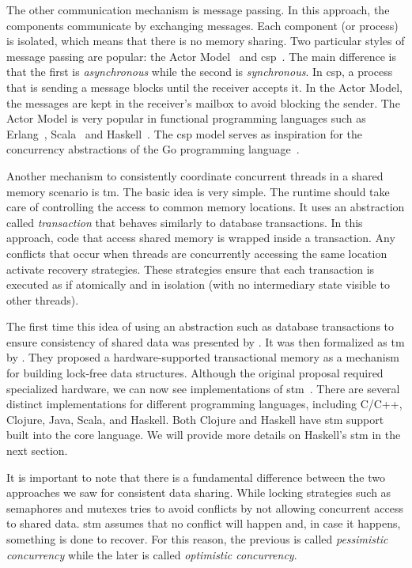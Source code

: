 The other communication mechanism is message passing. In this approach, the components communicate by exchanging messages. Each component (or process) is isolated, which means that there is no memory sharing. Two particular styles of message passing are popular: the Actor Model~\cite{agha:1986} and \ac{csp}~\cite{hoare:1978}. The main difference is that the first is \emph{asynchronous} while the second is \emph{synchronous}. In \acs{csp}, a process that is sending a message blocks until the receiver accepts it. In the Actor Model, the messages are kept in the receiver's mailbox to avoid blocking the sender. The Actor Model is very popular in functional programming languages such as Erlang~\cite{armstrong:2007}, Scala~\cite{haller:2009} and Haskell~\cite{epstein:2011}. The \acs{csp} model serves as inspiration for the concurrency abstractions of the Go programming language~\cite{pike:2012}.

Another mechanism to consistently coordinate concurrent threads in a shared memory scenario is \ac{tm}. The basic idea is very simple. The runtime should take care of controlling the access to common memory locations. It uses an abstraction called \emph{transaction} that behaves similarly to database transactions. In this approach, code that access shared memory is wrapped inside a transaction. Any conflicts that occur when threads are concurrently accessing the same location activate recovery strategies. These strategies ensure that each transaction is executed as if atomically and in isolation (with no intermediary state visible to other threads).

The first time this idea of using an abstraction such as database transactions to ensure consistency of shared data was presented by . It was then formalized as \acl{tm} by . They proposed a hardware-supported transactional memory as a mechanism for building lock-free data structures. Although the original proposal required specialized hardware, we can now see implementations of \ac{stm}~\cite{shavit:1995}. There are several distinct implementations for different programming languages, including C/C++, Clojure, Java, Scala, and Haskell. Both Clojure and Haskell have  \acs{stm} support built into the core language. We will provide more details on Haskell's \acs{stm} in the next section.

It is important to note that there is a fundamental difference between the two approaches we saw for consistent data sharing. While locking strategies such as semaphores and mutexes tries to avoid conflicts by not allowing concurrent access to shared data. \acs{stm} assumes that no conflict will happen and, in case it happens, something is done to recover. For this reason, the previous is called \emph{pessimistic concurrency} while the later is called \emph{optimistic concurrency}.


